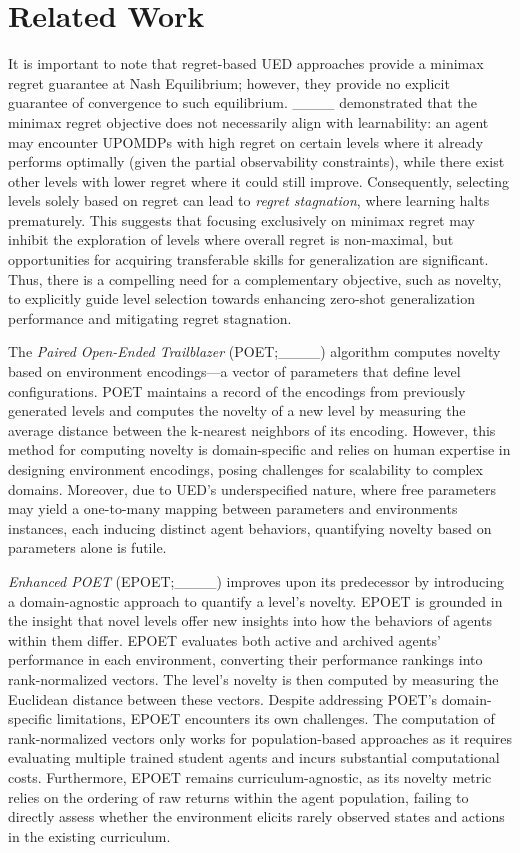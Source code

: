 \section{Related Work}
\label{section:related_works}
It is important to note that regret-based UED approaches provide a minimax regret guarantee at Nash Equilibrium; however, they provide no explicit guarantee of convergence to such equilibrium. ____ demonstrated that the minimax regret objective does not necessarily align with learnability: an agent may encounter UPOMDPs with high regret on certain levels where it already performs optimally (given the partial observability constraints), while there exist other levels with lower regret where it could still improve. Consequently, selecting levels solely based on regret can lead to {\em regret stagnation}, where learning halts prematurely. This suggests that focusing exclusively on minimax regret may inhibit the exploration of levels where overall regret is non-maximal, but opportunities for acquiring transferable skills for generalization are significant. Thus, there is a compelling need for a complementary objective, such as novelty, to explicitly guide level selection towards enhancing zero-shot generalization performance and mitigating regret stagnation.

The {\em Paired Open-Ended Trailblazer} (POET;____) algorithm computes novelty based on environment encodings---a vector of parameters that define level configurations. POET maintains a record of the encodings from previously generated levels and computes the novelty of a new level by measuring the average distance between the k-nearest neighbors of its encoding. However, this method for computing novelty is domain-specific and relies on human expertise in designing environment encodings, posing challenges for scalability to complex domains. Moreover, due to UED's underspecified nature, where free parameters may yield a one-to-many mapping between parameters and environments instances, each inducing distinct agent behaviors, quantifying novelty based on parameters alone is futile. 

{\em Enhanced POET} (EPOET;____) improves upon its predecessor by introducing a domain-agnostic approach to quantify a level's novelty. EPOET is grounded in the insight that novel levels offer new insights into how the behaviors of agents within them differ. EPOET evaluates both active and archived agents' performance in each environment, converting their performance rankings into rank-normalized vectors. The level's novelty is then computed by measuring the Euclidean distance between these vectors. Despite addressing POET's domain-specific limitations, EPOET encounters its own challenges. The computation of rank-normalized vectors only works for population-based approaches as it requires evaluating multiple trained student agents and incurs substantial computational costs. Furthermore, EPOET remains curriculum-agnostic, as its novelty metric relies on the ordering of raw returns within the agent population, failing to directly assess whether the environment elicits rarely observed states and actions in the existing curriculum.

